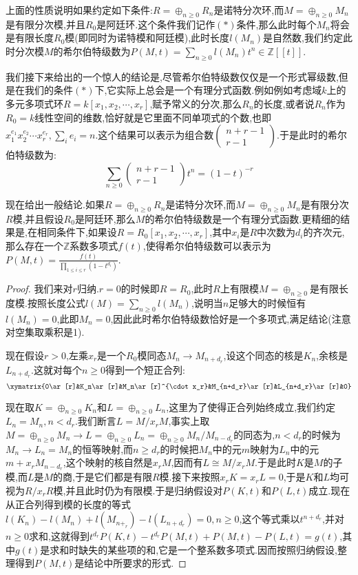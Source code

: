 上面的性质说明如果约定如下条件:$R=\oplus_{n\ge0}R_n$是诺特分次环,而$M=\oplus_{n\ge0}M_n$是有限分次模,并且$R_0$是阿廷环.这个条件我们记作$(*)$条件,那么此时每个$M_n$将会是有限长度$R_0$模(即同时为诺特模和阿廷模),此时长度$l(M_n)$是自然数,我们约定此时分次模$M$的希尔伯特级数为$P(M,t)=\sum_{n\ge0}l(M_n)t^n\in\mathbb{Z}[[t]]$.

我们接下来给出的一个惊人的结论是,尽管希尔伯特级数仅仅是一个形式幂级数,但是在我们的条件$(*)$下,它实际上总会是一个有理分式函数.例如例如考虑域$k$上的多元多项式环$R=k[x_1,x_2,\cdots,x_r]$,赋予常义的分次,那么$R_n$的长度,或者说$R_n$作为$R_0=k$线性空间的维数,恰好就是它里面不同单项式的个数,也即$x_1^{e_1}x_2^{e_2}\cdots x_r^{e_r},\sum_ie_i=n$.这个结果可以表示为组合数$\left(\begin{array}{c}n+r-1\\r-1\end{array}\right)$.于是此时的希尔伯特级数为:
$$\sum_{n\ge0}\left(\begin{array}{c}n+r-1\\r-1\end{array}\right)t^n=(1-t)^{-r}$$

现在给出一般结论.如果$R=\oplus_{n\ge0}R_n$是诺特分次环,而$M=\oplus_{n\ge0}M_n$是有限分次$R$模,并且假设$R_0$是阿廷环,那么$M$的希尔伯特级数是一个有理分式函数.更精细的结果是,在相同条件下,如果设$R=R_0[x_1,x_2,\cdots,x_r]$,其中$x_i$是$R$中次数为$d_i$的齐次元,那么存在一个$\mathbb{Z}$系数多项式$f(t)$,使得希尔伯特级数可以表示为$P(M,t)=\frac{f(t)}{\prod_{1\le i\le r}(1-t^{d_i})}$.
\begin{proof}
	
	我们来对$r$归纳.$r=0$的时候即$R=R_0$,此时$R$上有限模$M=\oplus_{n\ge0}$是有限长度模.按照长度公式$l(M)=\sum_{n\ge0}l(M_n)$,说明当$n$足够大的时候恒有$l(M_n)=0$,此即$M_n=0$,因此此时希尔伯特级数恰好是一个多项式,满足结论(注意对空集取乘积是1).
	
	现在假设$r>0$,左乘$x_r$是一个$R_0$模同态$M_n\to M_{n+d_r}$,设这个同态的核是$K_n$,余核是$L_{n+d_r}$.这就对每个$n\ge0$得到一个短正合列:
	$$\xymatrix{0\ar[r]&K_n\ar[r]&M_n\ar[r]^{\cdot x_r}&M_{n+d_r}\ar[r]&L_{n+d_r}\ar[r]&0}$$
	
	现在取$K=\oplus_{n\ge0}K_n$和$L=\oplus_{n\ge0}L_n$,这里为了使得正合列始终成立,我们约定$L_n=M_n,n<d_r$.我们断言$L=M/x_rM$,事实上取$M=\oplus_{n\ge0}M_n\to L=\oplus_{n\ge0}L_n=\oplus_{n\ge0}M_n/M_{n-d_r}$的同态为,$n<d_r$的时候为$M_n\to L_n=M_n$的恒等映射,而$n\ge d_r$的时候把$M_n$中的元$m$映射为$L_n$中的元$m+x_rM_{n-d_r}$,这个映射的核自然是$x_rM$,因而有$L\cong M/x_rM$.于是此时$K$是$M$的子模,而$L$是$M$的商,于是它们都是有限$R$模.接下来按照$x_rK=x_rL=0$,于是$K$和$L$均可视为$R/x_rR$模,并且此时仍为有限模.于是归纳假设对$P(K,t)$和$P(L,t)$成立.现在从正合列得到模的长度的等式$l(K_n)-l(M_n)+l(M_{n+_r})-l(L_{n+d_r})=0,n\ge0$,这个等式乘以$t^{n+d_r}$,并对$n\ge0$求和,这就得到$t^{d_r}P(K,t)-t^{d_r}P(M,t)+P(M,t)-P(L,t)=g(t)$,其中$g(t)$是求和时缺失的某些项的和,它是一个整系数多项式.因而按照归纳假设,整理得到$P(M,t)$是结论中所要求的形式.
\end{proof}

